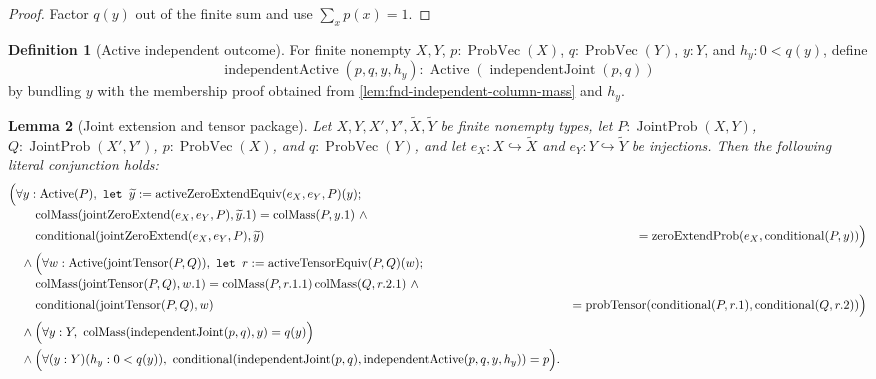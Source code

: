 \documentclass[9pt]{extarticle}
\newtheorem{lemma}{Lemma}[section]
\theoremstyle{definition}
\newtheorem{definition}[lemma]{Definition}
\theoremstyle{remark}
\begin{document}
\begin{proof}
Factor $q(y)$ out of the finite sum and use $\sum_xp(x)=1$.
\end{proof}

\begin{definition}[Active independent outcome]
\label{def:fnd-independent-active}
For finite nonempty $X,Y$, $p:\operatorname{ProbVec}(X)$,
$q:\operatorname{ProbVec}(Y)$, $y:Y$, and $h_y:0<q(y)$, define
\[
 \operatorname{independentActive}(p,q,y,h_y):
 \operatorname{Active}(\operatorname{independentJoint}(p,q))
\]
by bundling $y$ with the membership proof obtained from
\cref{lem:fnd-independent-column-mass} and $h_y$.
\end{definition}

\begin{lemma}[Joint extension and tensor package]
\label{lem:fnd-joint-extension-package}
Let $X,Y,X',Y',\widetilde X,\widetilde Y$ be finite nonempty types, let
$P:\operatorname{JointProb}(X,Y)$,
$Q:\operatorname{JointProb}(X',Y')$,
$p:\operatorname{ProbVec}(X)$, and $q:\operatorname{ProbVec}(Y)$, and let
$e_X:X\hookrightarrow\widetilde X$ and
$e_Y:Y\hookrightarrow\widetilde Y$ be injections.  Then the following
literal conjunction holds:
\begin{align*}
 &\Bigl(\forall y:\operatorname{Active}(P),\
  \texttt{let }\widetilde y:=
   \operatorname{activeZeroExtendEquiv}(e_X,e_Y,P)(y);\\[-2pt]
 &\qquad
 \operatorname{colMass}
   (\operatorname{jointZeroExtend}(e_X,e_Y,P),\widetilde y.1)
 =\operatorname{colMass}(P,y.1)\ \wedge\\[-2pt]
 &\qquad
 \operatorname{conditional}
   (\operatorname{jointZeroExtend}(e_X,e_Y,P),\widetilde y)
 &=\operatorname{zeroExtendProb}
   (e_X,\operatorname{conditional}(P,y))\Bigr)\\
 &\quad\wedge\Bigl(
 \forall w:\operatorname{Active}(\operatorname{jointTensor}(P,Q)),\
 \texttt{let }r:=\operatorname{activeTensorEquiv}(P,Q)(w);\\[-2pt]
 &\qquad
 \operatorname{colMass}(\operatorname{jointTensor}(P,Q),w.1)
 =\operatorname{colMass}(P,r.1.1)\operatorname{colMass}(Q,r.2.1)
 \ \wedge\\[-2pt]
 &\qquad
 \operatorname{conditional}(\operatorname{jointTensor}(P,Q),w)
 &=\operatorname{probTensor}
   (\operatorname{conditional}(P,r.1),
    \operatorname{conditional}(Q,r.2))\Bigr)\\
 &\quad\wedge\Bigl(\forall y:Y,\
  \operatorname{colMass}(\operatorname{independentJoint}(p,q),y)=q(y)\Bigr)\\
 &\quad\wedge\Bigl(\forall(y:Y)(h_y:0<q(y)),\
  \operatorname{conditional}
   (\operatorname{independentJoint}(p,q),
    \operatorname{independentActive}(p,q,y,h_y))=p\Bigr).
\end{align*}
\end{lemma}
\end{document}
